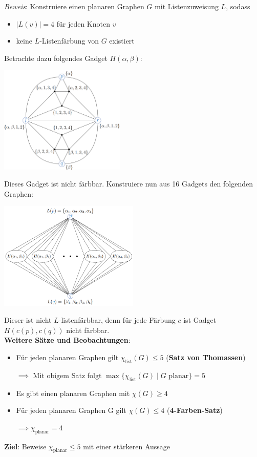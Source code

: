 \textit{Beweis}: Konstruiere einen planaren Graphen $G$ mit Listenzuweisung $L$, sodass 
\begin{itemize}
	\item $|L(v)|=4$ für jeden Knoten $v$
	\item keine $L$-Listenfärbung von $G$ existiert
\end{itemize}
Betrachte dazu folgendes Gadget $H(\alpha,\beta)$:
\begin{center}
	\includegraphics[width=0.45\textwidth]{images/lf-5.png}
\end{center}
Dieses Gadget ist nicht färbbar. Konstruiere nun aus 16 Gadgets den folgenden Graphen:
\begin{center}
	\includegraphics[width=0.5\textwidth]{images/lf-5-2.png}
\end{center}
Dieser ist nicht $L$-listenfärbbar, denn für jede Färbung $c$ ist Gadget $H(c(p),c(q))$ nicht färbbar.\\

\textbf{Weitere Sätze und Beobachtungen}:
\begin{itemize}
	\item Für jeden planaren Graphen gilt $\chi_{\text{list}}(G)\leq 5$ (\textbf{Satz von Thomassen})
	
	$\implies$ Mit obigem Satz folgt $\max\{\chi_{\text{list}}(G)\mid G \text{ planar}\}=5$
	\item Es gibt einen planaren Graphen mit $\chi(G)\geq 4$
	\item Für jeden planaren Graphen G gilt $\chi(G)\leq 4$ (\textbf{4-Farben-Satz})
	
	$\implies \chi_{\text{planar}}=4$ 
\end{itemize}
\bigskip
\textbf{Ziel}: Beweise $\chi_{\text{planar}}\leq 5$ mit einer stärkeren Aussage\\

